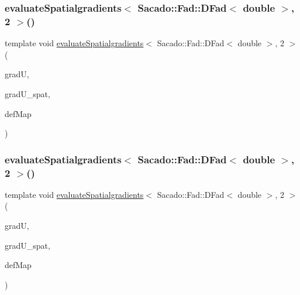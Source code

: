\mbox{\label{function_evaluations_8cc_a574a864ff662620c8b632523d5a2fe61}} 
\subsubsection{\texorpdfstring{evaluateSpatialgradients$<$ Sacado::Fad::DFad$<$ double $>$, 2 $>$()}{evaluateSpatialgradients< Sacado::Fad::DFad< double >, 2 >()}\hspace{0.1cm}{\footnotesize\ttfamily [1/2]}}
{\footnotesize\ttfamily template void \mbox{\hyperlink{group___evaluation_functions_ga0b976342d491f6215953e2e65ea6a0de}{evaluate\+Spatialgradients}}$<$ Sacado\+::\+Fad\+::\+D\+Fad$<$ double $>$, 2 $>$ (\begin{DoxyParamCaption}\item[{Table$<$ 2, Sacado\+::\+Fad\+::\+D\+Fad$<$ double $>$$>$ \&}]{gradU,  }\item[{Table$<$ 2, Sacado\+::\+Fad\+::\+D\+Fad$<$ double $>$$>$}]{grad\+U\+\_\+spat,  }\item[{\mbox{\hyperlink{structdeformation_map}{deformation\+Map}}$<$ Sacado\+::\+Fad\+::\+D\+Fad$<$ double $>$, 2 $>$ \&}]{def\+Map }\end{DoxyParamCaption})}

\mbox{\label{function_evaluations_8cc_ab89d365bd9b7a2124796e27f59a3b190}} 
\subsubsection{\texorpdfstring{evaluateSpatialgradients$<$ Sacado::Fad::DFad$<$ double $>$, 2 $>$()}{evaluateSpatialgradients< Sacado::Fad::DFad< double >, 2 >()}\hspace{0.1cm}{\footnotesize\ttfamily [2/2]}}
{\footnotesize\ttfamily template void \mbox{\hyperlink{group___evaluation_functions_ga0b976342d491f6215953e2e65ea6a0de}{evaluate\+Spatialgradients}}$<$ Sacado\+::\+Fad\+::\+D\+Fad$<$ double $>$, 2 $>$ (\begin{DoxyParamCaption}\item[{Table$<$ 3, Sacado\+::\+Fad\+::\+D\+Fad$<$ double $>$$>$ \&}]{gradU,  }\item[{Table$<$ 3, Sacado\+::\+Fad\+::\+D\+Fad$<$ double $>$$>$}]{grad\+U\+\_\+spat,  }\item[{\mbox{\hyperlink{structdeformation_map}{deformation\+Map}}$<$ Sacado\+::\+Fad\+::\+D\+Fad$<$ double $>$, 2 $>$ \&}]{def\+Map }\end{DoxyParamCaption})}

